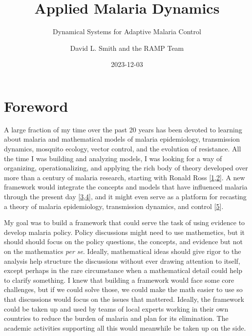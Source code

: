 \documentclass[
]{book}
\title{Applied Malaria Dynamics}
\subtitle{Dynamical Systems for Adaptive Malaria Control}
\author{David L. Smith and the RAMP Team}
\date{2023-12-03}
\begin{document}
\maketitle

{
\setcounter{tocdepth}{2}
\tableofcontents
}
\hypertarget{foreword}{%
\chapter*{Foreword}\label{foreword}}

A large fraction of my time over the past 20 years has been devoted to learning about malaria and mathematical models of malaria epidemiology, transmission dynamics, mosquito ecology, vector control, and the evolution of resistance.
All the time I was building and analyzing models, I was looking for a way of organizing, operationalizing, and applying the rich body of theory developed over more than a century of malaria research, starting with Ronald Ross {[}\protect\hyperlink{ref-RossR1911Book}{1},\protect\hyperlink{ref-SmithDL2012_RossMacdonald}{2}{]}.
A new framework would integrate the concepts and models that have influenced malaria through the present day {[}\protect\hyperlink{ref-ReinerRC2013SystematicReview}{3},\protect\hyperlink{ref-SmithNR2018AgentbasedModels}{4}{]}, and it might even serve as a platform for recasting a theory of malaria epidemiology, transmission dynamics, and control {[}\protect\hyperlink{ref-SmithDL2014_Recasting}{5}{]}.

My goal was to build a framework that could serve the task of using evidence to develop malaria policy.
Policy discussions might need to use mathemetics, but it should should focus on the policy questions, the concepts, and evidence but not on the mathematics \emph{per se}.
Ideally, mathematical ideas should give rigor to the analysis help structure the discussions without ever drawing attention to itself, except perhaps in the rare circumstance when a mathematical detail could help to clarify something.
I knew that building a framework would face some core challenges, but if we could solve those, we could make the math easier to use so that discussions would focus on the issues that mattered.
Ideally, the framework could be taken up and used by teams of local experts working in their own countries to reduce the burden of malaria and plan for its elimination.
The academic activities supporting all this would meanwhile be taken up on the side.
\end{document}
